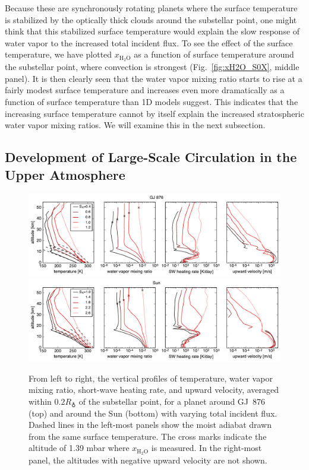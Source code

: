 \documentclass[11pt,numberedappendix,twocolappendix,]{emulateapj}
\def\water{H$_2$O}
\def\xwater{$x_\text{\water}$}
\def\preslevel{1.39 mbar}
\def\wv{water vapor}
\begin{document}
Because these are synchronously rotating planets where the surface temperature is stabilized by the optically thick clouds around the substellar point, one might think that this stabilized surface temperature would explain the slow  response of \wv{} to the increased total incident flux. 
To see the effect of the surface temperature, we have plotted \xwater{} as a function of surface temperature around the substellar point, where convection is strongest (Fig.~\ref{fig:xH2O_S0X}, middle panel). 
It is then clearly seen that the \wv{}  mixing ratio starts to rise at a fairly modest surface temperature and increases even more dramatically as a function of surface temperature than 1D models suggest. 
This indicates that the increasing surface temperature cannot by itself explain the increased stratospheric \wv{} mixing ratios. 
We will examine this in the next subsection. 

\subsection{Development of Large-Scale Circulation in the Upper Atmosphere}
\label{ss:result_omega}


\begin{figure}[htb]
    \begin{center}
    \includegraphics[width=1\hsize]{AqOH0TLS_GJ876_temp_xH2O_vz_heat.pdf}
    \includegraphics[width=1\hsize]{AqOH0TLS_Sun_temp_xH2O_vz_heat.pdf}
    \end{center}
\caption{From left to right, the vertical profiles of temperature, \wv{} mixing ratio, short-wave heating rate, and upward velocity, averaged within $0.2R_\earth$ of the substellar point, for a planet around GJ~876 (top) and around the Sun (bottom) with varying total incident flux. Dashed lines in the left-most panels show the moist adiabat drawn from the same surface temperature. The cross marks indicate the altitude of \preslevel{} where \xwater{} is measured. In the right-most panel, the altitudes with negative upward velocity are not shown. }
\label{fig:AqOH0TLS_GJ876_temp_xH2O_vz_heat}
\end{figure}
\end{document}
